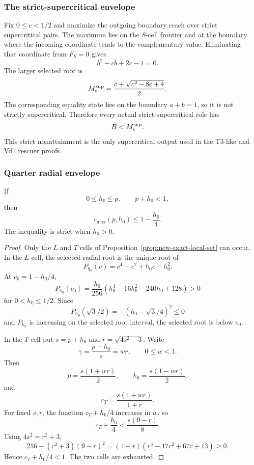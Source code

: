 \subsubsection{The strict-supercritical envelope}

Fix $0\le c<1/2$ and maximize the outgoing boundary reach over strict
supercritical pairs.  The maximum lies on the $S$-cell frontier and at the
boundary where the incoming coordinate tends to the complementary value.
Eliminating that coordinate from $F_S=0$ gives
\[
 b^2-cb+2c-1=0.
\]
The larger selected root is
\[
 M_c^{\rm sup}=\frac{c+\sqrt{c^2-8c+4}}2.
\]
The corresponding equality state lies on the boundary $a+b=1$, so it is not
strictly supercritical.  Therefore every actual strict-supercritical role has
\[
 B<M_c^{\rm sup}.
\]
This strict nonattainment is the only supercritical output used in the T3-like
and Vd1 rescuer proofs.

\subsubsection{Quarter radial envelope}

\begin{lemma}
\label{lem:new-quarter-radial-envelope}
If
\[
 0\le h_0\le p,
 \qquad p+h_0<1,
\]
then
\[
 \boxed{c_{\max}(p,h_0)\le1-\frac{h_0}{4}.}
 \tag{6.69}
\]
The inequality is strict when $h_0>0$.
\end{lemma}

\begin{proof}
Only the $L$ and $T$ cells of Proposition~\ref{prop:new-exact-local-set} can
occur.  In the $L$ cell, the selected radial root is the unique root of
\[
 P_{h_0}(c)=c^4-c^2+h_0c-h_0^2.
\]
At $c_0=1-h_0/4$,
\[
 P_{h_0}(c_0)
 =\frac{h_0}{256}
 (h_0^3-16h_0^2-240h_0+128)>0
\]
for $0<h_0\le1/2$.  Since
\[
 P_{h_0}(\sqrt3/2)=-(h_0-\sqrt3/4)^2\le0
\]
and $P_{h_0}$ is increasing on the selected root interval, the selected root
is below $c_0$.

In the $T$ cell put $s=p+h_0$ and $r=\sqrt{4s^2-3}$.  Write
\[
 \gamma=\frac{p-h_0}{s}=wr,
 \qquad0\le w<1.
\]
Then
\[
 p=\frac{s(1+wr)}2,
 \qquad h_0=\frac{s(1-wr)}2,
\]
and
\[
 c_T=\frac{s(1+wr)}{1+r}.
\]
For fixed $s,r$, the function $c_T+h_0/4$ increases in $w$, so
\[
 c_T+\frac{h_0}{4}
 <\frac{s(9-r)}8.
\]
Using $4s^2=r^2+3$,
\[
256-(r^2+3)(9-r)^2
=(1-r)(r^3-17r^2+67r+13)\ge0.
\]
Hence $c_T+h_0/4<1$.  The two cells are exhausted.
\end{proof}

